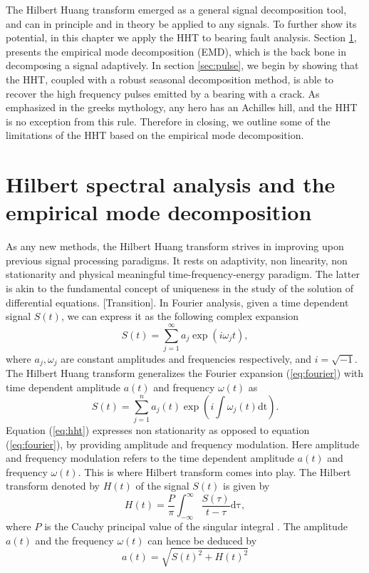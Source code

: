 \documentclass[../Main/thesis.tex]{subfiles}
\begin{document}
\justify
The Hilbert Huang transform emerged as a general signal decomposition tool, and can in principle and in theory be applied to any signals. To further show its potential, in this chapter we apply the HHT to bearing fault analysis. Section \ref{sec:emd}, presents the empirical mode decomposition (EMD), which is the back bone in decomposing a signal adaptively. In section \ref{sec:pulse}, we begin by showing that the HHT, coupled with a robust seasonal decomposition method, is able to recover the high frequency pulses emitted by a bearing with a crack. As emphasized in the greeks mythology, any hero has an Achilles hill, and the HHT is no exception from this rule. Therefore in closing, we outline some of the limitations of the HHT based on the empirical mode decomposition.
\justify
\section{Hilbert spectral analysis and the empirical mode decomposition}
\label{sec:emd}
As any new methods, the Hilbert Huang transform strives in improving upon previous signal processing paradigms. It rests on adaptivity, non linearity, non stationarity and physical meaningful time-frequency-energy paradigm. The latter is akin to the fundamental concept of uniqueness in the study of the solution of differential equations.
[Transition]. 
In Fourier analysis, given a time dependent signal $S(t)$, we can express it as the following complex expansion
\begin{equation} \label{eq:fourier}
S(t) = \sum_{j=1}^{\infty}a_{j}\exp(i\omega_{j}t),
\end{equation}
where $a_{j}, \omega_{j}$ are constant amplitudes and frequencies respectively, and $i = \sqrt{-1}$. The Hilbert Huang transform generalizes the Fourier expansion (\ref{eq:fourier}) with time dependent amplitude $a(t)$ and frequency $\omega(t)$ as 
\begin{equation} \label{eq:hht}
S(t) = \sum_{j=1}^{n}a_{j}(t)\exp\left(i\int \omega_{j}(t)\mathrm{dt}\right).
\end{equation}
Equation (\ref{eq:hht}) expresses non stationarity as opposed to equation (\ref{eq:fourier}), by providing amplitude and frequency modulation. Here amplitude and frequency modulation refers to the time dependent amplitude $a(t)$ and frequency $\omega(t)$. This is where Hilbert transform comes into play. The Hilbert transform denoted by $H(t)$ of the signal $S(t)$ is given by
\begin{equation}\label{eq:hilbert}
H(t) = \frac{P}{\pi}\int_{-\infty}^{\infty}\frac{S(\tau)}{t-\tau}\mathrm{d\tau},
\end{equation}
where $P$ is the Cauchy principal value of the singular integral \cite{huang08}. The amplitude $a(t)$ and the frequency $\omega(t)$
can hence be deduced by 
\begin{equation}\label{eq:amplitude}
a(t) = \sqrt{S(t)^{2} + H(t)^{2}}
\end{equation}
\end{document}
